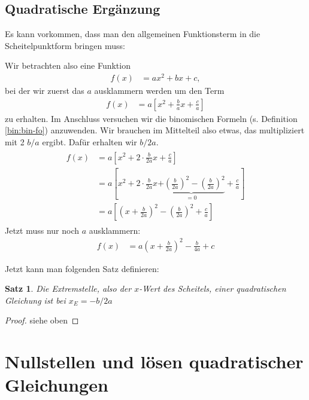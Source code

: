 \documentclass{report}
\newtheorem {satz}{Satz}
\newcommand{\x}{\cdot}
\theoremstyle{definition}
\theoremstyle{definition}
\theoremstyle{an}
\theoremstyle{lem}
\theoremstyle{def}
\theoremstyle{def}
\begin{document}
	\subsection{Quadratische Ergänzung}
	Es kann vorkommen, dass man den allgemeinen Funktionsterm in die Scheitelpunktform bringen muss:
	\medskip
	
	Wir betrachten also eine Funktion
	\begin{align}
	    f(x)&=ax^2+bx+c,
	\end{align}
	bei der wir zuerst das $a$ ausklammern werden um den Term
	\begin{align}
	    f(x)&=a \left[ x^2+\frac{b}{a}x+ \frac{c}{a} \right]
	\end{align}
	zu erhalten. Im Anschluss versuchen wir die binomischen Formeln (s. Definition \ref{bin:bin-fo}) anzuwenden. Wir brauchen im Mittelteil also etwas, das multipliziert mit 2 $b/a$ ergibt. Dafür erhalten wir $b/2a$.
	\begin{align}
	\begin{aligned}
	    f(x)&=a \left[ x^2+2\x\frac{b}{2a}x+ \frac{c}{a} \right] \\
	    &= a \left[ x^2+2\x\frac{b}{2a}x\underbrace{+\left( \frac{b}{2a}\right)^2-\left( \frac{b}{2a}\right)^2}_{=0} + \frac{c}{a} \right] \\
	    &= a\left[ \left( x+\frac{b}{2a} \right)^2 - \left( \frac{b}{2a}\right)^2+\frac{c}{a} \right]
	\end{aligned}
	\end{align}
	Jetzt muss nur noch $a$ ausklammern:
	\begin{align}
	f(x)&= a\left( x+\frac{b}{2a} \right)^2 - \frac{b}{4a}+c
	\end{align}
	
	Jetzt kann man folgenden Satz definieren:
	\begin{satz}
	Die Extremstelle, also der $x$-Wert des Scheitels, einer quadratischen Gleichung ist bei $x_E=-b/2a$
	\end{satz}
	\begin{proof}
	siehe oben
	\end{proof}
	
	\pagebreak
	\section{Nullstellen und lösen quadratischer Gleichungen}
\end{document}

